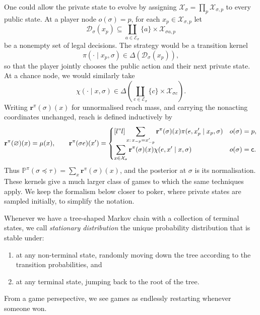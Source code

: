 \documentclass[12pt, a4paper]{article}
\begin{document}
\begin{remark}
One could allow the private state to evolve by assigning
$\mathcal X_\sigma=\prod_p\mathcal X_{\sigma,p}$ to every public state.  At a
player node $o(\sigma)=p$, for each $x_p\in\mathcal X_{\sigma,p}$ let
\[
  \mathcal D_\sigma(x_p)\subseteq
  \coprod_{a\in\mathcal E_\sigma}
  \{a\}\times\mathcal X_{\sigma a,p}
\]
be a nonempty set of legal decisions.  The strategy would be a transition
kernel
\[
  \pi(\cdot\mid x_p,\sigma)\in\Delta(\mathcal D_\sigma(x_p)),
\]
so that the player jointly chooses the public action and their next private
state.  At a chance node, we would similarly take
\[
  \chi(\cdot\mid x,\sigma)\in
  \Delta\!\left(\coprod_{c\in\mathcal E_\sigma}
  \{c\}\times\mathcal X_{\sigma c}\right).
\]
Writing $\mathbf r^\pi(\sigma)(x)$ for unnormalised reach mass, and carrying
the nonacting coordinates unchanged, reach is defined inductively by
\[
\mathbf r^\pi(\varnothing)(x)=\mu(x),\qquad
\mathbf r^\pi(\sigma e)(x')=
\begin{cases}[l"l]
\displaystyle\sum_{x:\,x_{-p}=x'_{-p}}
\mathbf r^\pi(\sigma)(x)\pi(e,x'_p\mid x_p,\sigma)
& o(\sigma)=p,\\
\displaystyle\sum_{x\in\mathcal X_\sigma}
\mathbf r^\pi(\sigma)(x)\chi(e,x'\mid x,\sigma)
& o(\sigma)=\mathsf c.
\end{cases}
\]
Thus $\mathbb P^\pi(\sigma\preccurlyeq\tau)=\sum_x\mathbf r^\pi(\sigma)(x)$,
and the posterior at $\sigma$ is its normalisation.  These kernels give a much
larger class of games to which the same techniques apply.  We keep the
formalism below closer to poker, where private states are sampled initially,
to simplify the notation.
\end{remark}

\begin{notation}\label{not:stationary-distribution}
  Whenever we have a tree-shaped Markov chain with a collection of terminal states, we call \textit{stationary distribution} the unique probability distribution that is stable under:
  \begin{enumerate}[label = (\roman*)]
    \item at any non-terminal state, randomly moving down the tree according to the transition probabilities, and
    \item at any terminal state, jumping back to the root of the tree.
  \end{enumerate}
  From a game persepective, we see games as endlessly restarting whenever someone won.
\end{notation}
\end{document}
